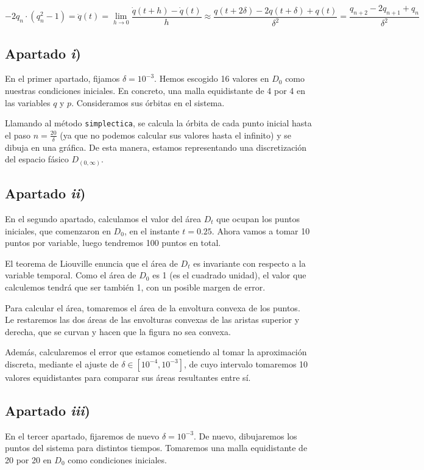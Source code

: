 \documentclass[a4paper]{article}
\begin{document}
	\[ -2q_n\cdot(q_n^2-1) = \ddot{q}(t) = 
	\lim_{h\to 0} \frac{\dot{q}(t+h)-\dot{q}(t)}{h} \approx 
	\frac{q(t+2\delta)-2q(t+\delta)+q(t)}{\delta^2} =
	\frac{q_{n+2}-2q_{n+1}+q_n}{\delta^2}
	\]
	
	\subsection{Apartado \textit{i})}
	En el primer apartado, fijamos $\delta= 10^{-3}$. Hemos escogido 16 valores en $D_0$ como nuestras condiciones iniciales. En concreto, una malla equidistante de 4 por 4 en las variables $q$ y $p$. Consideramos sus órbitas en el sistema.  
	
	Llamando al método \verb+simplectica+, se calcula la órbita de cada punto inicial hasta el paso $n = \frac{20}{\delta}$ (ya que no podemos calcular sus valores hasta el infinito) y se dibuja en una gráfica. De esta manera, estamos representando una discretización del espacio fásico $D_{(0,\infty)}$.
	
	
	\subsection{Apartado \textit{ii})}
	En el segundo apartado, calculamos el valor del área $D_t$ que ocupan los puntos iniciales, que comenzaron en $D_0$, en el instante $t=0.25$. Ahora vamos a tomar 10 puntos por variable, luego tendremos 100 puntos en total.
	
	El teorema de Liouville enuncia que el área de $D_t$ es invariante con respecto a la variable temporal. Como el área de $D_0$ es 1 (es el cuadrado unidad), el valor que calculemos tendrá que ser también 1, con un posible margen de error.
	
	Para calcular el área, tomaremos el área de la envoltura convexa de los puntos. Le restaremos las dos áreas de las envolturas convexas de las aristas superior y derecha, que se curvan y hacen que la figura no sea convexa.
	
	Además, calcularemos el error que estamos cometiendo al tomar la aproximación discreta, mediante el ajuste de $\delta\in[10^{-4},10^{-3}]$, de cuyo intervalo tomaremos 10 valores equidistantes para comparar sus áreas resultantes entre sí.
	
	\subsection{Apartado \textit{iii})}
	En el tercer apartado, fijaremos de nuevo $\delta=10^{-3}$. De nuevo, dibujaremos los puntos del sistema para distintos tiempos. Tomaremos una malla equidistante de 20 por 20 en $D_0$ como condiciones iniciales.
	
\end{document}
